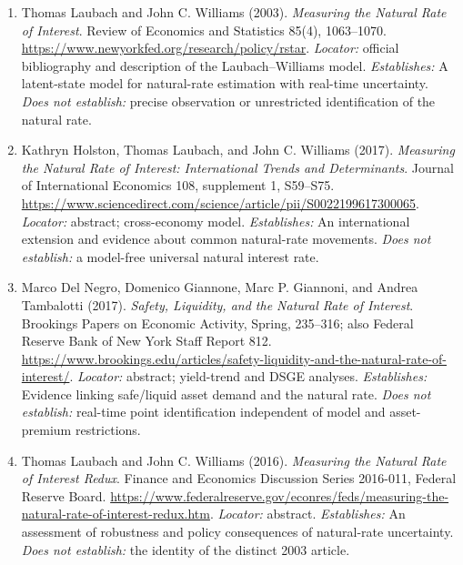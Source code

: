 \documentclass[11pt,a4paper]{article}
\begin{document}
\begin{enumerate}

\item[S1] Thomas Laubach and John C. Williams (2003). \emph{Measuring the Natural Rate of Interest}. Review of Economics and Statistics 85(4), 1063--1070. \url{https://www.newyorkfed.org/research/policy/rstar}. \textit{Locator:} official bibliography and description of the Laubach--Williams model. \textit{Establishes:} A latent-state model for natural-rate estimation with real-time uncertainty. \textit{Does not establish:} precise observation or unrestricted identification of the natural rate.

\item[S2] Kathryn Holston, Thomas Laubach, and John C. Williams (2017). \emph{Measuring the Natural Rate of Interest: International Trends and Determinants}. Journal of International Economics 108, supplement 1, S59--S75. \url{https://www.sciencedirect.com/science/article/pii/S0022199617300065}. \textit{Locator:} abstract; cross-economy model. \textit{Establishes:} An international extension and evidence about common natural-rate movements. \textit{Does not establish:} a model-free universal natural interest rate.

\item[S3] Marco Del Negro, Domenico Giannone, Marc P. Giannoni, and Andrea Tambalotti (2017). \emph{Safety, Liquidity, and the Natural Rate of Interest}. Brookings Papers on Economic Activity, Spring, 235--316; also Federal Reserve Bank of New York Staff Report 812. \url{https://www.brookings.edu/articles/safety-liquidity-and-the-natural-rate-of-interest/}. \textit{Locator:} abstract; yield-trend and DSGE analyses. \textit{Establishes:} Evidence linking safe/liquid asset demand and the natural rate. \textit{Does not establish:} real-time point identification independent of model and asset-premium restrictions.

\item[S4] Thomas Laubach and John C. Williams (2016). \emph{Measuring the Natural Rate of Interest Redux}. Finance and Economics Discussion Series 2016-011, Federal Reserve Board. \url{https://www.federalreserve.gov/econres/feds/measuring-the-natural-rate-of-interest-redux.htm}. \textit{Locator:} abstract. \textit{Establishes:} An assessment of robustness and policy consequences of natural-rate uncertainty. \textit{Does not establish:} the identity of the distinct 2003 article.

\end{enumerate}
\end{document}
